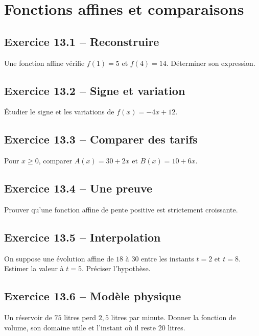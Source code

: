 \chapter{Fonctions affines et comparaisons}
\section*{Exercice 13.1 -- Reconstruire}
Une fonction affine vérifie $f(1)=5$ et $f(4)=14$. Déterminer son expression.

\section*{Exercice 13.2 -- Signe et variation}
Étudier le signe et les variations de $f(x)=-4x+12$.

\section*{Exercice 13.3 -- Comparer des tarifs}
Pour $x\geq0$, comparer $A(x)=30+2x$ et $B(x)=10+6x$.

\section*{Exercice 13.4 -- Une preuve}
Prouver qu'une fonction affine de pente positive est strictement croissante.

\section*{Exercice 13.5 -- Interpolation}
On suppose une évolution affine de $18$ à $30$ entre les instants $t=2$ et $t=8$. Estimer la valeur à $t=5$. Préciser l'hypothèse.

\section*{Exercice 13.6 -- Modèle physique}
Un réservoir de $75$ litres perd $2{,}5$ litres par minute. Donner la fonction de volume, son domaine utile et l'instant où il reste $20$ litres.
